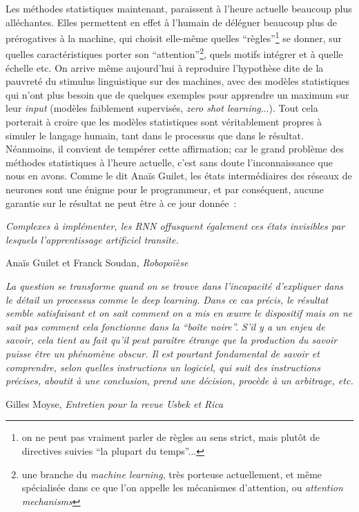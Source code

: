 \documentclass{article}
\newenvironment{citationbox}
{\begin{center}
		\begin{minipage}{.8\textwidth}
		}
		{
		\end{minipage}	
\end{center}
}
\begin{document}
			Les méthodes statistiques maintenant, paraissent à l'heure actuelle beaucoup plus alléchantes. Elles permettent en effet à l'humain de déléguer beaucoup plus de prérogatives à la machine, qui choisit elle-même quelles ``règles''\footnote{on ne peut pas vraiment parler de règles au sens strict, mais plutôt de directives suivies ``la plupart du temps''...} se donner, sur quelles caractéristiques porter son ``attention''\footnote{une branche du \textit{machine learning}, très porteuse actuellement, et même spécialisée dans ce que l'on appelle les mécanismes d'attention, ou \textit{attention mechanisms}}, quels motifs intégrer et à quelle échelle etc. On arrive même aujourd'hui à reproduire l'hypothèse dite de la pauvreté du stimulus linguistique sur des machines, avec des modèles statistiques qui n'ont plus besoin que de quelques exemples pour apprendre un maximum sur leur \textit{input} (modèles faiblement supervisés, \textit{zero shot learning}...). Tout cela porterait à croire que les modèles statistiques sont véritablement propres à simuler le langage humain, tant dans le processus que dans le résultat. Néanmoins, il convient de tempérer cette affirmation; car le grand problème des méthodes statistiques à l'heure actuelle, c'est sans doute l'inconnaissance que nous en avons. Comme le dit Anaïs Guilet, les états intermédiaires des réseaux de neurones sont une énigme pour le programmeur, et par conséquent, aucune garantie sur le résultat ne peut être à ce jour donnée~:
			\begin{citationbox}
				\textit{Complexes à implémenter, les RNN offusquent également ces états invisibles par lesquels l'apprentissage artificiel transite.}
				\begin{flushright}
					Anaïs Guilet et Franck Soudan, \textit{Robopoïèse} \cite{guilet2017}
				\end{flushright}
			\end{citationbox}
			\begin{citationbox}
				\textit{La question se transforme quand on se trouve dans l’incapacité d’expliquer dans le détail un processus comme le deep learning. Dans ce cas précis, le résultat semble satisfaisant et on sait comment on a mis en œuvre le dispositif mais on ne sait pas comment cela fonctionne dans la ``boîte noire''. S’il y a un enjeu de savoir, cela tient au fait qu’il peut paraître étrange que la production du savoir puisse être un phénomène obscur. Il est pourtant fondamental de savoir et comprendre, selon quelles instructions un logiciel, qui suit des instructions précises, aboutit à une conclusion, prend une décision, procède à un arbitrage, etc.}
				\begin{flushright}
					Gilles Moyse, \textit{Entretien pour la revue Usbek et Rica} \cite{edin2018}
				\end{flushright}
			\end{citationbox}
\end{document}
